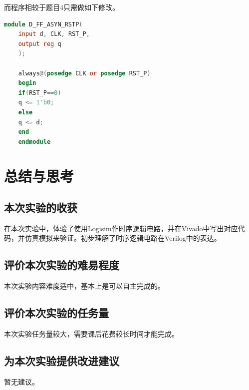 \documentclass[UTF8]{article}
\begin{document}
	而程序相较于题目4只需做如下修改。
	\begin{lstlisting}[language = Verilog, name=向下9到0计数(RST高电平有效)]
	module D_FF_ASYN_RSTP(
	input d, CLK, RST_P,
	output reg q
	);
	
	always@(posedge CLK or posedge RST_P)
	begin
	if(RST_P==0)
	q <= 1'b0;
	else
	q <= d;
	end
	endmodule
	\end{lstlisting}
	
	
	\section{总结与思考}
	
	\subsection{本次实验的收获}
	在本次实验中，体验了使用Logisim作时序逻辑电路，并在Vivado中写出对应代码，并仿真模拟来验证。初步理解了时序逻辑电路在Verilog中的表达。\par
	
	\subsection{评价本次实验的难易程度}
	本次实验内容难度适中，基本上是可以自主完成的。\par
	
	\subsection{评价本次实验的任务量}
	本次实验任务量较大，需要课后花费较长时间才能完成。\par
	
	\subsection{为本次实验提供改进建议}
	暂无建议。
	
\end{document}
